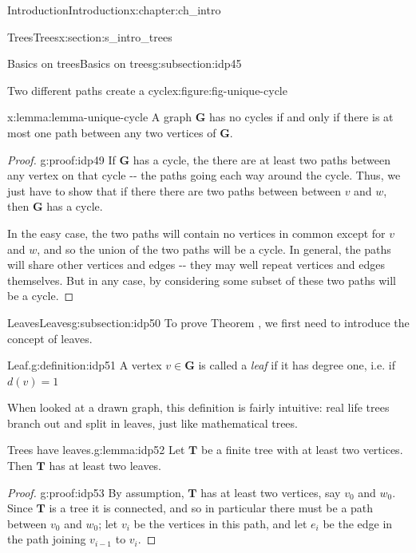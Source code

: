 \documentclass[oneside,10pt,]{book}
\numberwithin{equation}{section}
\newcommand{\bfG}{\mathbf{G}}
\newcommand{\bfT}{\mathbf{T}}
\begin{document}
\begin{chapterptx}{Introduction}{}{Introduction}{}{}{x:chapter:ch_intro}
\begin{sectionptx}{Trees}{}{Trees}{}{}{x:section:s_intro_trees}
\begin{subsectionptx}{Basics on trees}{}{Basics on trees}{}{}{g:subsection:idp45}
\begin{figureptx}{Two different paths create a cycle}{x:figure:fig-unique-cycle}{}
\begin{image}{0.05}{0.9}{0.05}
{
}%
\end{image}%
\tcblower
\end{figureptx}%
\begin{lemma}{}{}{x:lemma:lemma-unique-cycle}%
A graph \(\bfG\) has no cycles if and only if there is at most one path between any two vertices of \(\bfG\).%
\end{lemma}
\begin{proof}{}{g:proof:idp49}
If \(\bfG\) has a cycle, the there are at least two paths between any vertex on that cycle -{}-{} the paths going each way around the cycle.  Thus, we just have to show that if there there are two paths between between \(v\) and \(w\), then \(\bfG\) has a cycle.%
\par
In the easy case, the two paths will contain no vertices in common except for \(v\) and \(w\), and so the union of the two paths will be a cycle.  In general, the paths will share other vertices and edges -{}-{} they may well repeat vertices and edges themselves.  But in any case, by considering some subset of these two paths will be a cycle.%
\end{proof}
\end{subsectionptx}
%
%
\typeout{************************************************}
\typeout{************************************************}
%
\begin{subsectionptx}{Leaves}{}{Leaves}{}{}{g:subsection:idp50}
To prove Theorem , we first need to introduce the concept of leaves.%
\begin{definition}{Leaf.}{g:definition:idp51}%
A vertex \(v\in\bfG\) is called a \emph{leaf} if it has degree one, i.e. if \(d(v)=1\)%
\end{definition}
When looked at a drawn graph, this definition is fairly intuitive: real life trees branch out and split in leaves, just like mathematical trees.%
\begin{lemma}{Trees have leaves.}{}{g:lemma:idp52}%
Let \(\bfT\) be a finite tree with at least two vertices.  Then \(\bfT\) has at least two leaves.\end{lemma}
\begin{proof}{}{g:proof:idp53}
By assumption, \(\bfT\) has at least two vertices, say \(v_0\) and \(w_0\).  Since \(\bfT\) is a tree it is connected, and so in particular there must be a path between \(v_0\) and \(w_0\); let \(v_i\) be the vertices in this path, and let \(e_i\) be the edge in the path joining \(v_{i-1}\) to \(v_i\).%

\end{proof}
\end{subsectionptx}
\end{sectionptx}
\end{chapterptx}
\end{document}
